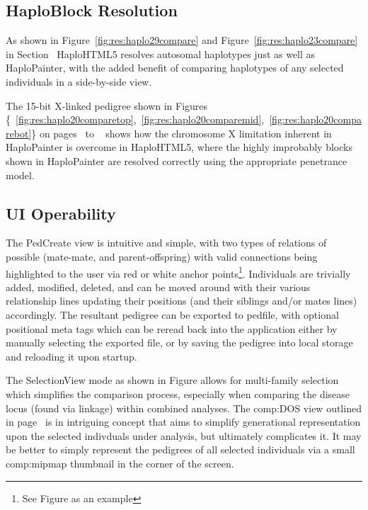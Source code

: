 \subsection{HaploBlock Resolution}
As shown in Figure~\ref{fig:res:haplo29compare} and Figure~\ref{fig:res:haplo23compare} in Section~ HaploHTML5 resolves autosomal haplotypes just as well as HaploPainter, with the added benefit of comparing haplotypes of any selected individuals in a side-by-side view. 

The 15-bit X-linked pedigree shown in Figures \{~\ref{fig:res:haplo20comparetop},~\ref{fig:res:haplo20comparemid},~\ref{fig:res:haplo20comparebot}\} on pages~\pageref*{fig:res:haplo20comparetop} to ~\pageref*{fig:res:haplo20comparebot} shows how the chromosome X limitation inherent in HaploPainter is overcome in HaploHTML5, where the highly improbably blocks shown in HaploPainter are resolved correctly using the appropriate penetrance model.

\subsection{UI Operability}
The PedCreate view is intuitive and simple, with two types of relations of possible (mate-mate, and parent-offspring) with valid connections being highlighted to the user via red or white anchor points\footnote{See Figure as an example}. Individuals are trivially added, modified, deleted, and can be moved around with their various relationship lines updating their positions (and their siblings and/or mates lines) accordingly. The resultant pedigree can be exported to pedfile, with optional positional meta tags which can be reread back into the application either by manually selecting the exported file, or by saving the pedigree into local storage and reloading it upon startup.

The SelectionView mode as shown in Figure allows for multi-family selection which simplifies the comparison process, especially when comparing the disease locus (found via linkage) within combined analyses. The \gls{comp:DOS} view outlined in page~\pageref{ref:haplo:dos} is in intriguing concept that aims to simplify generational representation upon the selected indivduals under analysis, but ultimately complicates it. It may be better to simply represent the pedigrees of all selected individuals via a small \gls{comp:mipmap} thumbnail in the corner of the screen.

